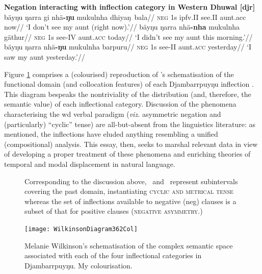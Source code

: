 \pex \textbf{Negation interacting with inflection category in Western Dhuwal [\gls{djr}]}
\a {}\begingl\gla bäyŋu ŋarra gi nhä\textbf{-ŋu} mukulnha dhiyaŋ~bala//
\glb \textsc{neg} 1s \gls{ipfv}.\gls{II} see.\gls{II} aunt.\gls{acc} now//
\glft`I don't see my aunt (right now).'//\endgl
\a\begingl\gla {}bäyŋu ŋarra nhä\textbf{-nha} mukulnha gäthur//
\glb \textsc{neg} 1s see-\gls{IV} aunt.\textsc{acc} today//
\glft`I didn't see my aunt this morning.'//\endgl
\a\begingl\gla{}bäyŋu ŋarra nhä\textbf{-ŋu} mukulnha barpuru//
\glb \textsc{neg} 1s see-\gls{II} aunt.\textsc{acc} yesterday//
\glft`I saw my aunt yesterday.'//\endgl
\xe 




 Figure \ref{WilkDia} comprises a (colourised) reproduction of \citeauthor{Wilkinson1991}'s schematisation of the functional domain (and collocation features) of each Djambarrpuyŋu inflection \citeyearpar[326]{Wilkinson1991}. This diagram bespeaks the nontriviality of the distribution (and, therefore, the semantic value) of each inflectional category. Discussion of the phenomena characterising the \gls{wd} verbal paradigm (\textit{viz.} asymmetric negation and (particularly) ``cyclic'' tense) are all-but-absent from the linguistics literature: as mentioned, the inflections have eluded anything resembling a unified (compositional) analysis. This essay, then, seeks to marshal relevant data in view of developing a proper treatment of these phenomena and enriching theories of temporal and modal displacement in natural language. 
 

\begin{figure}\caption[\citeauthor{Wilkinson1991}'s multidimensional schema for Djambarrpuyŋu inflection]{Melanie Wilkinson's \citeyearpar[326]{Wilkinson1991} schematisation of the complex semantic space associated with each of the four inflectional categories in Djambarrpuyŋu. My colourisation.
}\label{WilkDia}

Corresponding to the discussion above, \I\ and \III\ represent subintervals covering the past domain, instantiating \textsc{cyclic and metrical tense} whereas the set of inflections available to negative (\gls{neg}) clauses is a subset of that for positive clauses (\textsc{negative asymmetry}.)

\centering
	\texttt{[image: WilkinsonDiagram362Col]}
\end{figure}


